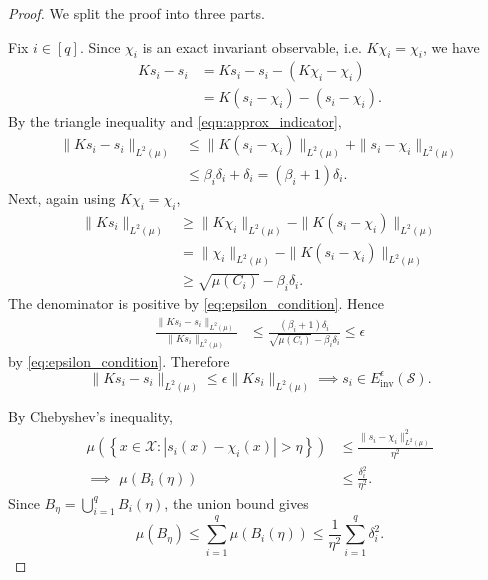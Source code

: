 \documentclass[letterpaper, 10 pt, conference]{ieeeconf}
\newcommand{\Sc}{\mathcal{S}}
\newcommand{\Xc}{\mathcal{X}}
\begin{document}
\begin{proof}
We split the proof into three parts.

Fix $i \in [q]$. Since $\chi_i$ is an exact invariant observable, i.e. $K\chi_i=\chi_i$, we have
\begin{align*}
    Ks_i-s_i
    &= Ks_i-s_i - (K\chi_i-\chi_i) \\
    &= K(s_i-\chi_i) - (s_i-\chi_i).
\end{align*}
By the triangle inequality and \eqref{eqn:approx_indicator}, 
\begin{align*}
    \|{Ks_i-s_i}\|_{L^2(\mu)}
    &\leq \|{K(s_i-\chi_i)}\|_{L^2(\mu)} + \|{s_i-\chi_i}\|_{L^2(\mu)} \\
    &\leq \beta_i\delta_i + \delta_i = (\beta_i+1)\delta_i.
\end{align*}
Next, again using $K\chi_i=\chi_i$,
\begin{align*}
    \|{Ks_i}\|_{L^2(\mu)}
    &\geq
    \|{K\chi_i}\|_{L^2(\mu)}
    -
    \|{K(s_i-\chi_i)}\|_{L^2(\mu)} \\
    &=
    \|{\chi_i}\|_{L^2(\mu)}
    -
    \|{K(s_i-\chi_i)}\|_{L^2(\mu)} \\
    &\geq
    \sqrt{\mu(C_i)}-
    \beta_i\delta_i.
\end{align*}
The denominator is positive by \eqref{eq:epsilon_condition}. Hence
\begin{align*}
    \frac{\|{Ks_i-s_i}\|_{L^2(\mu)}}
    {\|{Ks_i}\|_{L^2(\mu)}}
    &\leq
    \frac{(\beta_i+1)\delta_i} {\sqrt{\mu(C_i)}-\beta_i\delta_i} \leq \epsilon
\end{align*}
by \eqref{eq:epsilon_condition}. Therefore
\begin{equation}
      \|{Ks_i-s_i}\|_{L^2(\mu)}
    \leq
    \epsilon\|{Ks_i}\|_{L^2(\mu)} \implies s_i\in E_{\text{inv}}^{\epsilon}(\Sc).
\label{eqn:s_in_Einv}
\end{equation}

By Chebyshev's inequality,
\begin{align*}
    \mu(\left\{x\in \Xc:|s_i(x)-\chi_i(x)|>\eta\right\})
    &\leq \frac{\|{s_i-\chi_i}\|_{L^2(\mu)}^2}{\eta^2} \\
    \implies \,\, \mu(B_i(\eta)) &\leq
    \frac{\delta_i^2}{\eta^2}.
\end{align*}
Since $B_\eta=\bigcup_{i=1}^q B_i(\eta)$, the union bound gives
\[
    \mu(B_\eta) \leq \sum_{i=1}^q \mu(B_i(\eta)) \leq \frac{1}{\eta^2}\sum_{i=1}^q \delta_i^2.
\]


\end{proof}
\end{document}
